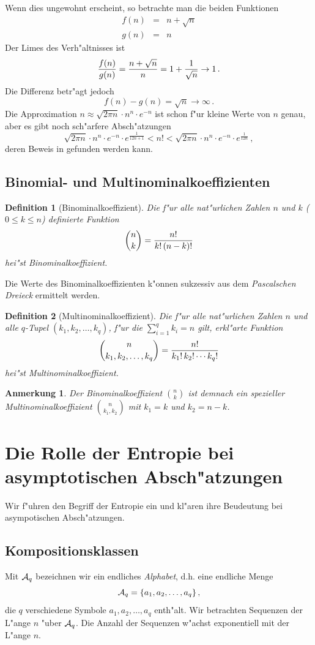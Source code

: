 \documentclass[10pt]{article}
\newtheorem{definition}{Definition}[section]
\newtheorem{anmerk}{Anmerkung}[section]
\begin{document}
Wenn dies ungewohnt erscheint, so betrachte man die beiden Funktionen
\begin{eqnarray*}
  f(n) & = & n + \sqrt{n} \\
  g(n) & = & n
\end{eqnarray*}
Der Limes des Verh"altnisses ist
$$ {f(n)\over g(n)}={n+\sqrt{n}\over n}=1+{1\over\sqrt{n}}\rightarrow 1\, .$$
Die Differenz betr"agt jedoch 
$$ f(n)-g(n)=\sqrt{n}\rightarrow\infty \, .$$
Die Approximation $n\approx\sqrt{2\pi n} \cdot n^n \cdot e^{-n}$ ist schon 
f"ur kleine Werte von $n$ genau, aber es gibt noch sch"arfere 
Absch"atzungen
$$
  \sqrt{2\pi n} \cdot n^n \cdot e^{-n} \cdot e^{\frac{1}{12n+1}} < n ! <
  \sqrt{2\pi n} \cdot n^n \cdot e^{-n} \cdot e^{\frac{1}{12n}}\, ,
  \label{scharfStirling}
$$
deren Beweis in \cite{krengel91} gefunden werden kann.

\subsection{Binomial- und Multinominalkoeffizienten}
\begin{definition}[Binominalkoeffizient]
  Die f"ur alle nat"urlichen Zahlen $n$ und $k$ ($0\le k\le n$) definierte 
  Funktion 
  $$
    {n\choose k} = {n!\over k!\, (n-k)!} 
  $$
  hei"st Binominalkoeffizient.
\end{definition}
Die Werte des Binominalkoeffizienten k"onnen sukzessiv aus dem 
\emph{Pascalschen Dreieck} ermittelt werden.
\begin{definition}[Multinominalkoeffizient]
  Die f"ur alle nat"urlichen Zahlen $n$ und alle $q$-Tupel 
  $(k_1,k_2,\ldots,k_q)$, f"ur die $\sum_{i=1}^q k_i=n$ gilt, erkl"arte
  Funktion
  $$
    {n\choose k_1, k_2,\ldots, k_q}={n!\over k_1!\, k_2! \cdots k_q!}
  $$
  hei"st Multinominalkoeffizient.
\end{definition}
%
\begin{anmerk}
  Der Binominalkoeffizient ${n\choose k}$ ist demnach ein spezieller 
  Multinominalkoeffizient ${n \choose k_1, k_2}$ mit $k_1=k$ und $k_2=n-k$.
\end{anmerk}


\section{Die Rolle der Entropie bei asymptotischen Ab\-sch"atzungen}
Wir f"uhren den Begriff der Entropie ein und kl"aren ihre Beudeutung bei
asympotischen Absch"atzungen.

\subsection{Kompositionsklassen}
Mit ${\cal A}_q$ bezeichnen wir ein endliches \emph{Alphabet}, d.h. eine 
endliche Menge 
$$ {\cal A}_q=\{a_1, a_2,\ldots, a_q\} \, ,$$
die $q$ verschiedene Symbole $a_1, a_2,\ldots, a_q$ enth"alt. Wir betrachten 
Sequenzen der L"ange $n$ "uber ${\cal A}_q$. Die Anzahl der Sequenzen w"achst
exponentiell mit der L"ange $n$.
\end{document}
